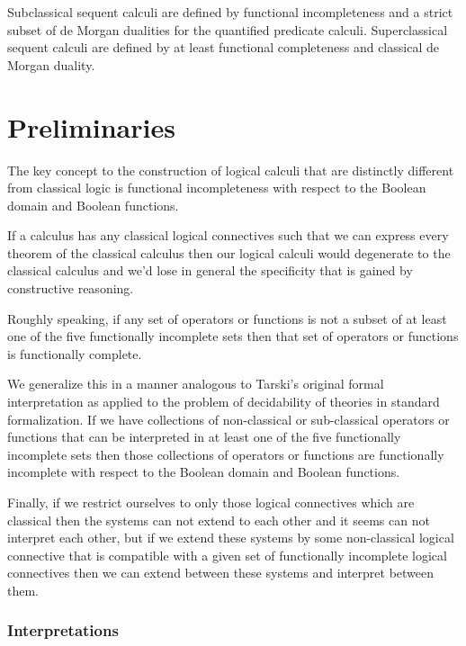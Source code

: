 Subclassical sequent calculi are defined by functional incompleteness and a strict subset of de Morgan dualities for the quantified predicate calculi.
Superclassical sequent calculi are defined by at least functional completeness and classical de Morgan duality.


\part{Preliminaries}
\begin{flushleft}
	The key concept to the construction of logical calculi that are distinctly different from classical logic is functional incompleteness with respect to the Boolean domain and Boolean functions.
\end{flushleft}
\begin{flushleft}
	If a calculus has any classical logical connectives such that we can express every theorem of the classical calculus then our logical calculi would degenerate to the classical calculus and we'd lose in general the specificity that is gained by constructive reasoning.
\end{flushleft}
\begin{flushleft}
	Roughly speaking, if any set of operators or functions is not a subset of at least one of the five functionally incomplete sets then that set of operators or functions is functionally complete.
\end{flushleft}
\begin{flushleft}
	We generalize this in a manner analogous to Tarski's original formal interpretation as applied to the problem of decidability of theories in standard formalization. If we have collections of non-classical or sub-classical operators or functions that can be interpreted in at least one of the five functionally incomplete sets then those collections of operators or functions are functionally incomplete with respect to the Boolean domain and Boolean functions.
\end{flushleft}
\begin{flushleft}
	Finally, if we restrict ourselves to only those logical connectives which are classical then the systems can not extend to each other and it seems can not interpret each other, but if we extend these systems by some non-classical logical connective that is compatible with a given set of functionally incomplete logical connectives then we can extend between these systems and interpret between them.
\end{flushleft}
\section{Interpretations}
